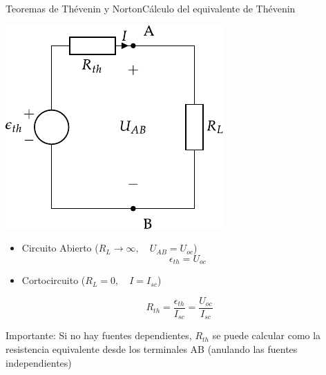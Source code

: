\documentclass[aspectratio=169, xcolor={usenames,svgnames,dvipsnames}]{beamer}
\begin{document}
\begin{frame}{Teoremas de Thévenin y Norton}{Cálculo del equivalente de Thévenin}
\begin{minipage}[c]{0.4\linewidth}
\begin{center}
\includegraphics[width=.9\linewidth]{../figs/thevenin_continua.pdf}
\end{center}
\end{minipage}
\hfill
\begin{minipage}[c]{0.58\linewidth}
\begin{itemize}
\item Circuito Abierto (\(R_L \to \infty, \quad U_{AB} = U_{oc}\))
\[
\boxed{\epsilon_{th} = U_{oc}}
\]
\item Cortocircuito (\(R_L = 0, \quad I = I_{sc}\))
\end{itemize}
\[
\boxed{R_{th} = \frac{\epsilon_{th}}{I_{sc}} = \frac{U_{oc}}{I_{sc}}}
\]
\end{minipage}

\vspace{5mm}
\alert{Importante:} Si no hay fuentes dependientes, $R_{th}$ se puede calcular como la \alert{resistencia} equivalente desde los terminales AB (anulando las fuentes independientes)
\end{frame}
\end{document}
